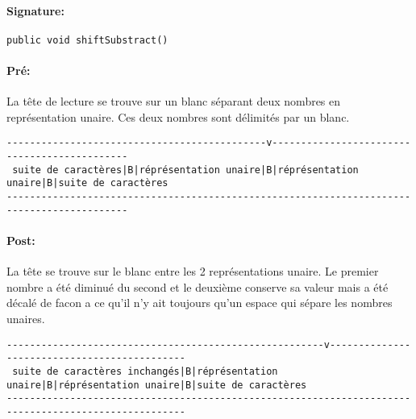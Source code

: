 \documentclass[a4paper,11pt]{article}
\begin{document}
\paragraph{Signature:} \texttt{public void shiftSubstract()}
\paragraph{Pré:}
La tête de lecture se trouve sur un blanc séparant deux nombres en représentation unaire. Ces deux nombres sont délimités par un blanc.
\begin{small}
\begin{verbatim}
---------------------------------------------v---------------------------------------------
 suite de caractères|B|réprésentation unaire|B|réprésentation unaire|B|suite de caractères
-------------------------------------------------------------------------------------------
\end{verbatim}
\end{small}
\paragraph{Post:}
La tête se trouve sur le blanc entre les 2 représentations unaire. Le premier nombre a été diminué du second et le deuxième conserve sa valeur mais a été décalé de facon a ce qu'il n'y ait toujours qu'un espace qui sépare les nombres unaires.
\begin{footnotesize}
\begin{verbatim}
-------------------------------------------------------v---------------------------------------------
 suite de caractères inchangés|B|réprésentation unaire|B|réprésentation unaire|B|suite de caractères
-----------------------------------------------------------------------------------------------------
\end{verbatim}
\end{footnotesize}
\end{document}
